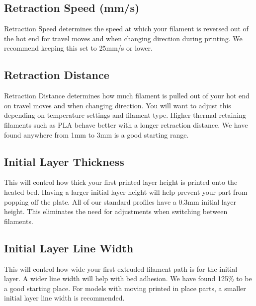 \subsection{Retraction Speed (mm/s)}
Retraction Speed determines the speed at which your filament is reversed out of the hot end for travel moves and when changing direction during printing. We recommend keeping this set to 25mm/s or lower.

\subsection{Retraction Distance}
Retraction Distance determines how much filament is pulled out of your hot end on travel moves and when changing direction. You will want to adjust this depending on temperature settings and filament type. Higher thermal retaining filaments such as PLA behave better with a longer retraction distance. We have found anywhere from 1mm to 3mm is a good starting range.

\subsection{Initial Layer Thickness}
This will control how thick your first printed layer height is printed onto the heated bed. Having a larger initial layer height will help prevent your part from popping off the plate. All of our standard profiles have a 0.3mm initial layer height. This eliminates the need for adjustments when switching between filaments.  %
\subsection{Initial Layer Line Width}
This will control how wide your first extruded filament path is for the initial layer. A wider line width will help with bed adhesion. We have found 125\% to be a good starting place. For models with moving printed in place parts, a smaller initial layer line width is recommended. %

